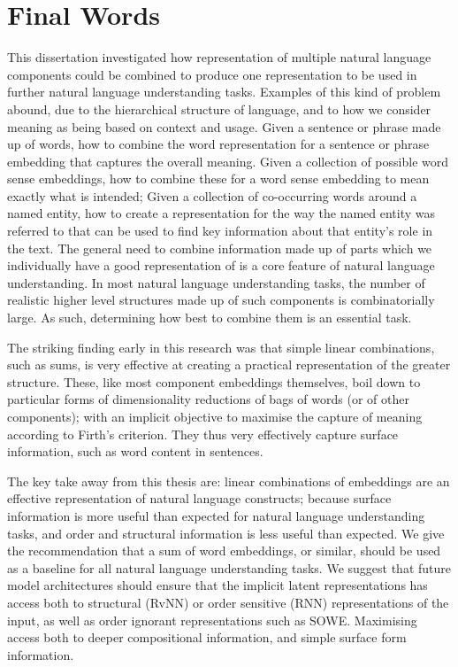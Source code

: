 \documentclass{book}
\begin{document}
\section{Final Words}
This dissertation investigated how representation of multiple natural language components could be combined to produce one representation to be used in further natural language understanding tasks.
Examples of this kind of problem abound, due to the hierarchical structure of language, and to how we consider meaning as being based on context and usage.
Given a sentence or phrase made up of words, how to combine the word representation for a sentence or phrase  embedding that captures the overall meaning.
Given a collection of possible word sense embeddings, how to combine these for a word sense embedding to mean exactly what is intended;
Given a collection of co-occurring words around a named entity, how to create a representation for the way the named entity was referred to that can be used to find key information about that entity's role in the text.
The general need to combine information made up of parts which we individually have a good representation of is a core feature of natural language understanding.
In most natural language understanding tasks, the number of realistic higher level structures made up of such components is combinatorially large.
As such, determining how best to combine them is an essential task.

The striking finding early in this research was that simple linear combinations, such as sums, is very effective at creating a practical representation of the greater structure.
These, like most component embeddings themselves, boil down to particular forms of dimensionality reductions of bags of words (or of other components); with an implicit objective to maximise the capture of meaning according to Firth's criterion.
They thus very effectively capture surface information, such as word content in sentences.

The key take away from this thesis are:
linear combinations of embeddings are an effective representation of natural language constructs;
because surface information is more useful than expected for natural language understanding tasks,
and order and structural information is less useful than expected.
We give the recommendation that a sum of word embeddings, or similar, should be used 
as a baseline for all natural language understanding tasks. 
We suggest that future model architectures should ensure that the implicit latent representations
has access both to structural (RvNN) or order sensitive (RNN) representations of the input,
as well as order ignorant representations such as SOWE.
Maximising access both to deeper compositional information,
and simple surface form information.



 
\end{document}
